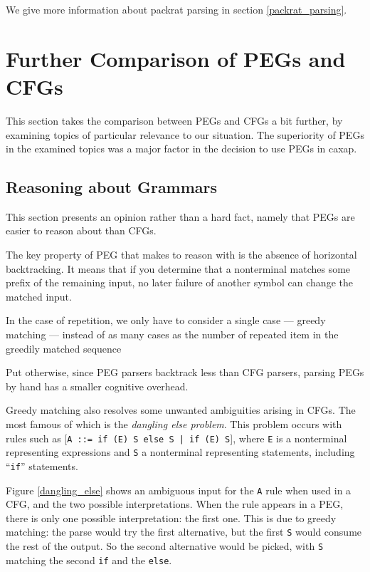 We give more information about packrat parsing in section
\ref{packrat_parsing}.

\section{Further Comparison of PEGs and CFGs}
\label{further_comp}

This section takes the comparison between PEGs and CFGs a bit further, by
examining topics of particular relevance to our situation. The superiority of
PEGs in the examined topics was a major factor in the decision to use PEGs in
caxap.

\subsection{Reasoning about Grammars}

This section presents an opinion rather than a hard fact, namely that PEGs are
easier to reason about than CFGs.

The key property of PEG that makes to reason with is the absence of horizontal
backtracking. It means that if you determine that a nonterminal matches some
prefix of the remaining input, no later failure of another symbol can change the
matched input.

In the case of repetition, we only have to consider a single case — greedy
matching — instead of as many cases as the number of repeated item in the
greedily matched sequence

Put otherwise, since PEG parsers backtrack less than CFG parsers, parsing PEGs
by hand has a smaller cognitive overhead.

Greedy matching also resolves some unwanted ambiguities arising in CFGs. The
most famous of which is the \emph{dangling else problem}. This problem occurs
with rules such as [\lstinline{A ::= if (E) S else S | if (E) S}], where
\texttt{E} is a nonterminal representing expressions and \texttt{S} a
nonterminal representing statements, including ``\texttt{if}'' statements.

Figure \ref{dangling_else} shows an ambiguous input for the \texttt{A} rule
when used in a CFG, and the two possible interpretations. When the rule appears
in a PEG, there is only one possible interpretation: the first one. This is due
to greedy matching: the parse would try the first alternative, but the first
\texttt{S} would consume the rest of the output. So the second alternative would
be picked, with \texttt{S} matching the second \texttt{if} and the
\texttt{else}.

